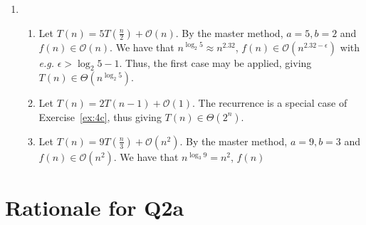 \documentclass[12pt]{article}
\begin{document}
\begin{enumerate}
\begin{enumerate}
    \end{enumerate}
    \item 
    \begin{enumerate}
        \item Let $T(n) = 5T(\frac{n}{2}) + \mathcal{O}(n)$. By the master method, $a = 5, b = 2$ and $f(n) \in \mathcal{O}(n)$. We have that $n^{\log_{2} 5} \approx n^{2.32}$, $f(n) \in \mathcal{O}(n^{2.32 - \epsilon})$ with \emph{e.g.} $\epsilon > \log_{2} 5 - 1$. Thus, the first case may be applied, giving $T(n) \in \Theta(n^{\log_{2} 5})$.
        \item Let $T(n) = 2T(n - 1) + \mathcal{O}(1)$. The recurrence is a special case of Exercise~\ref{ex:4c}, thus giving $T(n) \in \Theta(2^{n})$.
        \item Let $T(n) = 9T(\frac{n}{3}) + \mathcal{O}(n^{2})$. By the master method, $a = 9, b = 3$ and $f(n) \in \mathcal{O}(n^{2})$. We have that $n^{\log_{3} 9} = n^{2}$, $f(n)$
    \end{enumerate}
\end{enumerate}

\appendix

\section{Rationale for Q2a}
\end{document}

